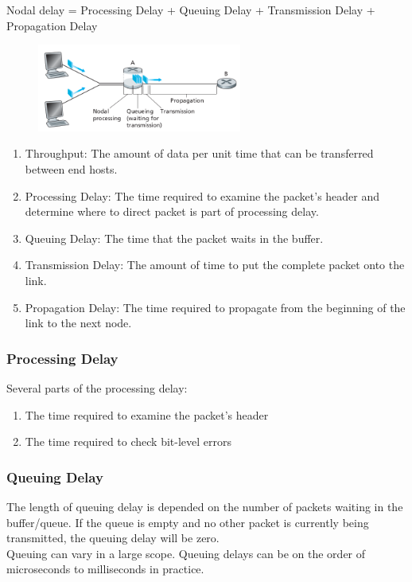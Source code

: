 Nodal delay = Processing Delay + Queuing Delay + Transmission Delay + Propagation Delay

\begin{figure}[!h]
    \centering
    \includegraphics[width=0.6\textwidth]{chapters/chapter1/Delays.png}
\end{figure}

\begin{enumerate}
    \item Throughput: The amount of data per unit time that can be transferred between end hosts.
    \item Processing Delay: The time required to examine the packet's header and determine where to direct packet is part of processing delay.
    \item Queuing Delay: The time that the packet waits in the buffer.
    \item Transmission Delay: The amount of time to put the complete packet onto the link.
    \item Propagation Delay: The time required to propagate from the beginning of the link to the next node.
\end{enumerate}


\subsubsection{Processing Delay}
Several parts of the processing delay:
\begin{enumerate}
    \item The time required to examine the packet's header
    \item The time required to check bit-level errors
\end{enumerate}


\subsubsection{Queuing Delay}
The length of queuing delay is depended on the number of packets waiting in the buffer/queue. If the queue is empty and no other packet is currently
being transmitted, the queuing delay will be zero.\\
Queuing can vary in a large scope. Queuing
delays can be on the order of microseconds to milliseconds in practice.


